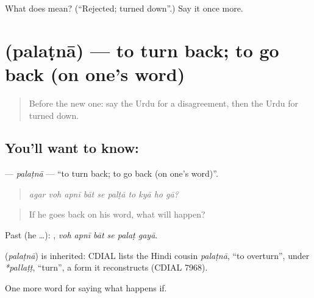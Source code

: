 \begin{tcolorbox}[breakable,colback=teal!4,colframe=teal!35!black,title={Before you move on}]
What does  mean? (\textquotedblleft{}Rejected; turned down\textquotedblright{}.) Say it once more.
\end{tcolorbox}
\section[\texorpdfstring{\ur{پلٹنا} (palaṭnā)}{پلٹنا (palaṭnā)}]{ (palaṭnā) — to turn back; to go back (on one's word)}

\label{lesson:UR-C530-palatna}



\begin{quote}
Before the new one: say the Urdu for a disagreement, then the Urdu for turned down.
\end{quote}

\subsection*{You'll want to know: }
\textbf{} — \emph{palaṭnā} — \textquotedblleft{}to turn back; to go back (on one's word)\textquotedblright{}.

\begin{quote}
         
\end{quote}

\begin{quote}
\emph{agar voh apnī bāt se palṭā to kyā ho gā?}
\end{quote}

\begin{quote}
If he goes back on his word, what will happen?
\end{quote}

Past (he …):      , \emph{voh apnī bāt se palaṭ gayā}.

\begin{cousinweb}
\textbf{} (\emph{palaṭnā}) is inherited: CDIAL lists the Hindi cousin \emph{palaṭnā}, \textquotedblleft{}to overturn\textquotedblright{}, under \emph{*pallaṭṭ}, \textquotedblleft{}turn\textquotedblright{}, a form it reconstructs (CDIAL 7968).
\end{cousinweb}

\begin{grammarlens}[title={What you've built}]
One more word for saying what happens if.
\end{grammarlens}

